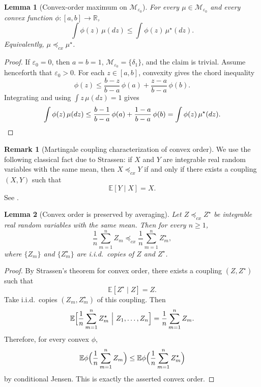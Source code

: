\documentclass[11pt]{amsart}
\newtheorem{lemma}[lemma]{Lemma}
\theoremstyle{definition}
\newtheorem{remark}[remark]{Remark}
\newcommand{\R}{\mathbb R}
\newcommand{\E}{\mathbb E}
\newcommand{\cM}{\mathcal M}
\begin{document}
\begin{lemma}[Convex-order maximum on $\cM_{\varepsilon_0}$]\label{lem:cx-max}
For every $\mu\in\cM_{\varepsilon_0}$ and every convex function $\phi:[a,b]\to\R$,
\[
\int \phi(z)\,\mu(dz)\le \int \phi(z)\,\mu^\star(dz).
\]
Equivalently, $\mu\preceq_{cx}\mu^\star$.
\end{lemma}

\begin{proof}
If $\varepsilon_0=0$, then $a=b=1$, $\cM_{\varepsilon_0}=\{\delta_1\}$, and the claim is trivial.
Assume henceforth that $\varepsilon_0>0$.
For each $z\in[a,b]$, convexity gives the chord inequality
\[
\phi(z)\le \frac{b-z}{b-a}\,\phi(a)+\frac{z-a}{b-a}\,\phi(b).
\]
Integrating and using $\int z\,\mu(dz)=1$ gives
\[
\int\phi(z)\,\mu(dz)
\le \frac{b-1}{b-a}\,\phi(a)+\frac{1-a}{b-a}\,\phi(b)
=\int \phi(z)\,\mu^\star(dz).
\qedhere
\]
\end{proof}

\begin{remark}[Martingale coupling characterization of convex order]\label{rem:strassen}
We use the following classical fact due to Strassen: if $X$ and $Y$ are integrable real random variables with the same mean, then $X\preceq_{cx}Y$ if and only if there exists a coupling $(X,Y)$ such that
\[
\E[Y\mid X]=X.
\]
See \cite{strassen}.
\end{remark}

\begin{lemma}[Convex order is preserved by averaging]\label{lem:cx-average}
Let $Z\preceq_{cx} Z^\star$ be integrable real random variables with the same mean. Then for every $n\ge 1$,
\[
\frac1n\sum_{m=1}^n Z_m\preceq_{cx}\frac1n\sum_{m=1}^n Z_m^\star,
\]
where $\{Z_m\}$ and $\{Z_m^\star\}$ are i.i.d.\ copies of $Z$ and $Z^\star$.
\end{lemma}

\begin{proof}
By Strassen's theorem for convex order, there exists a coupling $(Z,Z^\star)$ such that
\[
\E[Z^\star\mid Z]=Z.
\]
Take i.i.d.\ copies $(Z_m,Z_m^\star)$ of this coupling. Then
\[
\E\Bigl[\frac1n\sum_{m=1}^n Z_m^\star\ \Big|\ Z_1,\dots,Z_n\Bigr]=\frac1n\sum_{m=1}^n Z_m.
\]
Therefore, for every convex $\phi$,
\[
\E\phi\Bigl(\frac1n\sum_{m=1}^n Z_m\Bigr)
\le
\E\phi\Bigl(\frac1n\sum_{m=1}^n Z_m^\star\Bigr)
\]
by conditional Jensen. This is exactly the asserted convex order.
\end{proof}
\end{document}
